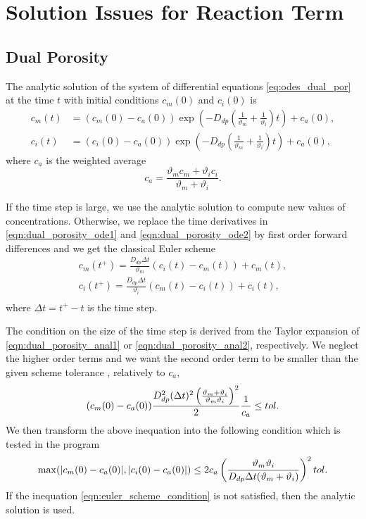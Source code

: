 \section{Solution Issues for Reaction Term}

% 

\subsection{Dual Porosity} 
\label{sec:num_dual_porosity}

The analytic solution of the system of differential equations \eqref{eq:odes_dual_por} at the time $t$ with initial conditions $c_m(0)$ and $c_i(0)$ is
\begin{align}
     c_m(t) &= (c_m(0) - c_a(0)) \exp\left(- D_{dp}\left(\frac{1}{\vartheta_m} + \frac{1}{\vartheta_i}\right) t \right) + c_a(0), 
     \label{eqn:dual_porosity_anal1}\\
     c_i(t) &= (c_i(0) - c_a(0)) \exp\left(- D_{dp}\left(\frac{1}{\vartheta_m} + \frac{1}{\vartheta_i}\right) t \right) + c_a(0),
     \label{eqn:dual_porosity_anal2}
\end{align}
where $c_a$ is the weighted average
\[
  c_a = \frac{\vartheta_m c_m + \vartheta_i c_i}{\vartheta_m + \vartheta_i}.
\]

If the time step is large, we use the analytic solution to compute new values of concentrations. 
Otherwise, we replace the time derivatives in \eqref{eqn:dual_porosity_ode1} and \eqref{eqn:dual_porosity_ode2} 
by first order forward differences and we get the classical Euler scheme
\begin{align}
  c_m(t^+) = \frac{D_{dp} \Delta t}{\vartheta_m}(c_i(t) - c_m(t)) + c_m(t), \\
  c_i(t^+) = \frac{D_{dp} \Delta t}{\vartheta_i}(c_m(t) - c_i(t)) + c_i(t), \\
\end{align}
where $\Delta t = t^+ - t$ is the time step. 

The condition on the size of the time step is derived from the Taylor expansion of 
\eqref{eqn:dual_porosity_anal1} or \eqref{eqn:dual_porosity_anal2}, respectively. We neglect the higher order 
terms and we want the second order term to be smaller than the given scheme tolerance 
, relatively to $c_a$,
\begin{equation}
  (c_m(0) - c_a(0))
  \frac{ D_{dp}^2 (\Delta t)^2 \left(\frac{\vartheta_m + \vartheta_i}{\vartheta_m \vartheta_i}\right)^2}{2}
  \frac{1}{c_a} \leq tol. \\
\end{equation}
We then transform the above inequation into the following condition which is tested in the program
\begin{equation} \label{eqn:euler_scheme_condition}
  \max(|c_m(0) - c_a(0)|, |c_i(0) - c_a(0)|) \leq 
  2 c_a \left(\frac{\vartheta_m \vartheta_i}{D_{dp} \Delta t (\vartheta_m + \vartheta_i)}\right)^2 tol. \\
\end{equation}
If the inequation \eqref{eqn:euler_scheme_condition} is not satisfied, then the analytic 
solution is used.


